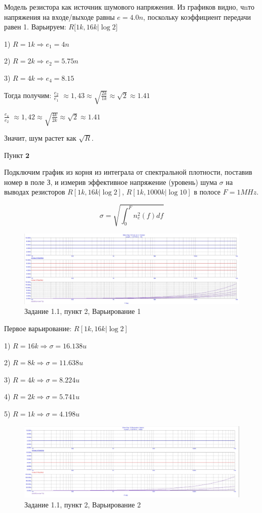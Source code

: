 \documentclass[a4paper, 14pt]{extarticle}%
\begin{document}
Модель резистора как источник шумового напряжения.
Из графиков видно, чnто напряжения на входе/выходе равны $e = 4.0n$, поскольку коэффициент передачи равен 1.
Варьируем: $R[1k, 16k | \log2$]


1) $R = 1k \Rightarrow e_1 = 4n$


2) $R = 2k \Rightarrow e_2 = 5.75n$

3) $R = 4k \Rightarrow e_4 = 8.15$


Тогда получим:
$\frac{e_2}{e_1}$ $\approx 1,43 \approx \sqrt{\frac{2k}{1k}} \approx \sqrt{2} \approx 1.41$

$\frac{e_4}{e_2}$ $\approx 1,42 \approx \sqrt{\frac{4k}{2k}} \approx \sqrt{2} \approx 1.41$

Значит, шум растет как $\sqrt{R}$.

$\textbf{Пункт 2}$

Подключим график из корня из интеграла от спектральной плотности, поставив номер в поле З, и измерив эффективное напряжение (уровень) шума $\sigma$ на выводах резисторов $R[1k, 16k | \log2]$, $R[1k, 1000k | \log10]$ в полосе $F = 1 MHz$.


\[ \sigma = \sqrt{\int_0^F n_e^{2}(f)df} \]

\begin{figure}[h!]
			\centering
			\includegraphics[width=1.1\linewidth]{pic1.jpg}
			\caption{Задание 1.1, пункт 2, Варьирование 1}
			\label{A}
\end{figure}

Первое варьирование: $R[1k, 16k | \log2]$

1) $R = 16k \Rightarrow \sigma = 16.138u$

2) $R = 8k \Rightarrow \sigma = 11.638u$

3) $R = 4k \Rightarrow \sigma = 8.224u$

4) $R = 2k \Rightarrow \sigma = 5.741u$

5) $R = 1k \Rightarrow \sigma = 4.198u$



\begin{figure}[h!]
	\centering
			\includegraphics[width=1.1\linewidth]{pic2.jpg}
			\caption{Задание 1.1, пункт 2, Варьирование 2}
	\label{A}
\end{figure}
\end{document}
